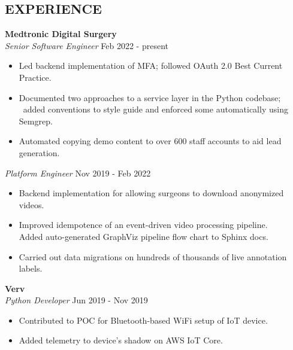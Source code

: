 \documentclass[line,margin]{res}
\begin{document}
\begin{resume}
\section{EXPERIENCE} \textbf{Medtronic Digital Surgery} \\
                {\sl Senior Software Engineer} \hfill   Feb 2022 - present \\
                 \begin{itemize}  \itemsep -2pt %
                   \item Led backend implementation of MFA; followed OAuth 2.0 Best Current Practice. 
                   \item Documented two approaches to a service layer in the Python codebase; \
                         added conventions to style guide and enforced some automatically using Semgrep.
                   \item Automated copying demo content to over 600 staff accounts to aid lead generation. 
                 \end{itemize}
                {\sl Platform Engineer} \hfill          Nov 2019 - Feb 2022 \\
                  \begin{itemize}  \itemsep -2pt %
                  \item Backend implementation for allowing surgeons to download anonymized videos.
                  \item Improved idempotence of an event-driven video processing pipeline. \\
                        Added auto-generated GraphViz pipeline flow chart to Sphinx docs. 
                  \item Carried out data migrations on hundreds of thousands of live annotation labels.
                  \end{itemize} 

                \textbf{Verv} \\
                {\sl Python Developer} \hfill        Jun 2019 - Nov 2019 \\
                  \begin{itemize} \itemsep -2pt %
                  \item Contributed to POC for Bluetooth-based WiFi setup of IoT device.\ 
                  \item Added telemetry to device's shadow on AWS IoT Core. 
                  \end{itemize} 


\end{resume}
\end{document}
